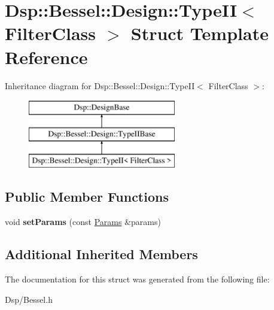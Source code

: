 \hypertarget{structDsp_1_1Bessel_1_1Design_1_1TypeII}{\section{Dsp\-:\-:Bessel\-:\-:Design\-:\-:Type\-I\-I$<$ Filter\-Class $>$ Struct Template Reference}
\label{structDsp_1_1Bessel_1_1Design_1_1TypeII}
}
Inheritance diagram for Dsp\-:\-:Bessel\-:\-:Design\-:\-:Type\-I\-I$<$ Filter\-Class $>$\-:\begin{figure}[H]
\begin{center}
\leavevmode
\includegraphics[height=3.000000cm]{structDsp_1_1Bessel_1_1Design_1_1TypeII}
\end{center}
\end{figure}
\subsection*{Public Member Functions}
\begin{DoxyCompactItemize}
\item 
\hypertarget{structDsp_1_1Bessel_1_1Design_1_1TypeII_ae4722a535017f677655794e7a59cb911}{void {\bfseries set\-Params} (const \hyperlink{structDsp_1_1Params}{Params} \&params)}\label{structDsp_1_1Bessel_1_1Design_1_1TypeII_ae4722a535017f677655794e7a59cb911}

\end{DoxyCompactItemize}
\subsection*{Additional Inherited Members}


The documentation for this struct was generated from the following file\-:\begin{DoxyCompactItemize}
\item 
Dsp/Bessel.\-h\end{DoxyCompactItemize}
